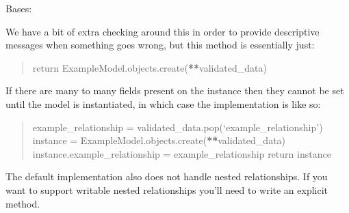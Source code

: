 \documentclass[letterpaper,10pt,english]{sphinxmanual}
\begin{document}

\begin{fulllineitems}
\label{\detokenize{source/meta_models_management:meta_models_management.serializers.InputRecordSerializer}}
\pysigstartsignatures
{}
\pysigstopsignatures
\sphinxAtStartPar
Bases: 

\begin{fulllineitems}
\label{\detokenize{source/meta_models_management:meta_models_management.serializers.InputRecordSerializer.create}}
\pysigstartsignatures
{}
\pysigstopsignatures
\sphinxAtStartPar
We have a bit of extra checking around this in order to provide
descriptive messages when something goes wrong, but this method is
essentially just:
\begin{quote}

\sphinxAtStartPar
return ExampleModel.objects.create({\color{red}\bfseries{}**}validated\_data)
\end{quote}

\sphinxAtStartPar
If there are many to many fields present on the instance then they
cannot be set until the model is instantiated, in which case the
implementation is like so:
\begin{quote}

\sphinxAtStartPar
example\_relationship = validated\_data.pop(‘example\_relationship’)
instance = ExampleModel.objects.create({\color{red}\bfseries{}**}validated\_data)
instance.example\_relationship = example\_relationship
return instance
\end{quote}

\sphinxAtStartPar
The default implementation also does not handle nested relationships.
If you want to support writable nested relationships you’ll need
to write an explicit  method.

\end{fulllineitems}


\end{fulllineitems}
\end{document}
